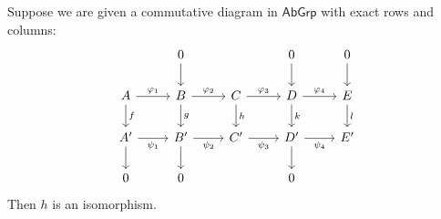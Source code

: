 \begin{proposition}
	Suppose we are given a commutative diagram in $\mathsf{AbGrp}$ with exact rows and columns:
	\begin{equation*}
		\begin{tikzcd}
			& 0\arrow[d] & & 0\arrow[d] & 0\arrow[d]\\
			A \arrow[d,"f"]\arrow[r,"\varphi_1"] & B \arrow[r,"\varphi_2"]\arrow[d,"g"] & C \arrow[r,"\varphi_3"]\arrow[d,"h"] & D \arrow[r,"\varphi_4"]\arrow[d,"k"] & E \arrow[d,"l"]\\
			A' \arrow[r,"\psi_1"']\arrow[d] & B' \arrow[r,"\psi_2"']\arrow[d] & C' \arrow[r,"\psi_3"'] & D' \arrow[r,"\psi_4"']\arrow[d] & E'\\
			0 & 0 & & 0
		\end{tikzcd}
	\end{equation*}
	Then $h$ is an isomorphism.
\end{proposition}

